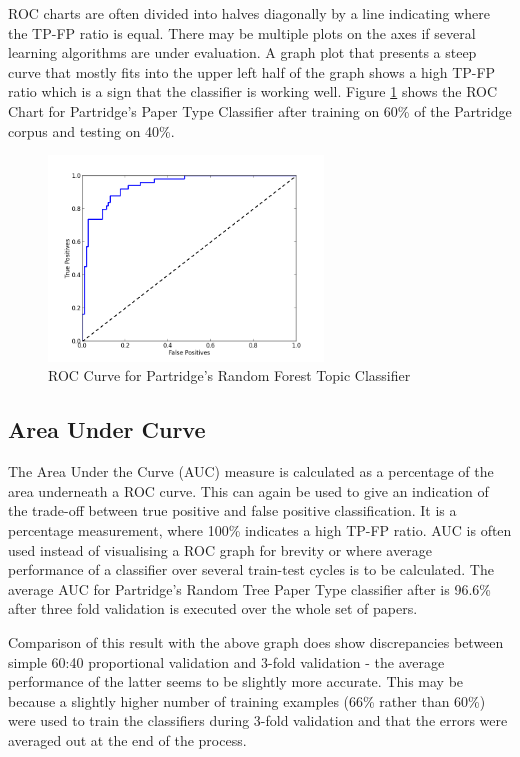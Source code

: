 ROC charts are often divided into halves diagonally by a line indicating where
the TP-FP ratio is equal. There may be multiple plots on the axes if several
learning algorithms are under evaluation. A graph plot that presents a steep
curve that mostly fits into the upper left half of the graph shows a high TP-FP
ratio which is a sign that the classifier is working well.  Figure
\ref{fig:roc_random_forest} shows the ROC Chart for Partridge's Paper Type
Classifier after training on 60\% of the Partridge corpus and testing on 40\%.

\begin{figure}[!h]
\begin{center}
\includegraphics[width=0.65\textwidth]{images/testing/ROC.png}
\caption{ ROC Curve for Partridge's Random Forest Topic Classifier}
\label{fig:roc_random_forest}
\end{center}
\end{figure}

\subsection{ Area Under Curve }

The Area Under the Curve (AUC) measure is calculated as a percentage of  the
area underneath a ROC curve. This can again be used to give an indication of
the trade-off between true positive and false positive classification. It is a
percentage measurement, where 100\% indicates a high TP-FP ratio. AUC is often
used instead of visualising a ROC graph for brevity or where average
performance of a classifier over several train-test cycles is to be calculated.
The average AUC for Partridge's Random Tree Paper Type classifier after is
96.6\% after three fold validation is executed over the whole set of papers.

Comparison of this result with the above graph does show discrepancies between
simple 60:40 proportional validation and 3-fold validation - the average
performance of the latter seems to be slightly more accurate. This may be
because a slightly higher number of training examples (66\% rather than 60\%)
were used to train the classifiers during 3-fold validation and that the errors
were averaged out at the end of the process.

